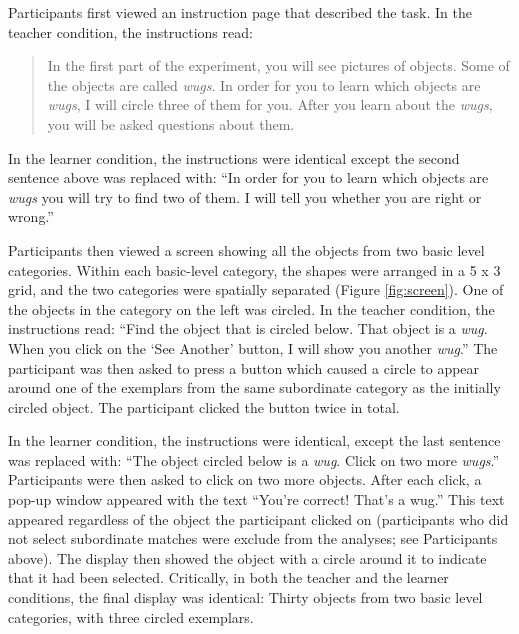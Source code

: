 \documentclass[man]{apa2}
\begin{document}
Participants first viewed an instruction page that described the task. In the teacher condition, the instructions read: 
\begin{quote}
In the first part of the experiment, you will see pictures of objects. Some of the objects are called \textit{wugs}. In order for you to learn which objects are \textit{wugs}, I will circle three of them for you. After you learn about the \textit{wugs}, you will be asked questions about them.
\end{quote}
In the learner condition, the instructions were identical except the second sentence above was replaced with: ``In order for you to learn which objects are \textit{wugs} you will try to find two of them. I will tell you whether you are right or wrong.''

Participants then viewed a screen showing all the objects from two basic level categories. Within each basic-level category, the shapes were arranged in a 5 x 3 grid, and the two categories were spatially separated (Figure \ref{fig:screen}). One of the objects in the category on the left was circled. In the teacher condition, the instructions read: ``Find the object that is circled below. That object is a \textit{wug}. When you click on the `See Another' button, I will show you another \textit{wug}.'' The participant was then asked to press a button which caused a circle to appear around one of the exemplars from the same subordinate category as the initially circled object. The participant clicked the button twice in total. 

In the learner condition, the instructions were identical, except the last sentence was replaced with: ``The object circled below is a \textit{wug}. Click on two more \textit{wugs}.'' Participants were then asked to click on two more objects. After each click, a pop-up window appeared with the text ``You're correct! That's a wug.'' This text appeared regardless of the object the participant clicked on (participants who did not select subordinate matches were exclude from the analyses; see Participants above). The display then showed the object with a circle around it to indicate that it had been selected. Critically, in both the teacher and the learner conditions, the final display was identical: Thirty objects from two basic level categories, with three circled exemplars.
\end{document}
